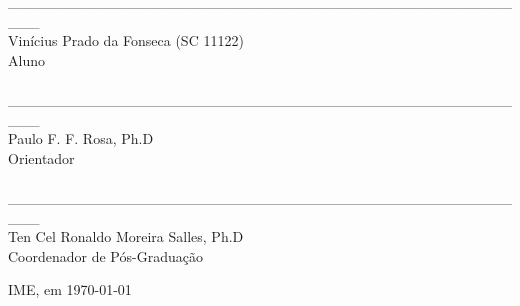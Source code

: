 \newpage
\begin{center}
\_\_\_\_\_\_\_\_\_\_\_\_\_\_\_\_\_\_\_\_\_\_\_\_\_\_\_\_\_\_\_\_\_\_\_\_\_\_\_\_\_\_\_\_\_\_\_\_\_\_\_ \\

Vinícius Prado da Fonseca (SC 11122) \\Aluno \\ 
 
\hspace{4cm}
\\


\_\_\_\_\_\_\_\_\_\_\_\_\_\_\_\_\_\_\_\_\_\_\_\_\_\_\_\_\_\_\_\_\_\_\_\_\_\_\_\_\_\_\_\_\_\_\_\_\_\_\_ \\
Paulo F. F. Rosa, Ph.D \\Orientador \\ 

\hspace{4cm}
\\


\_\_\_\_\_\_\_\_\_\_\_\_\_\_\_\_\_\_\_\_\_\_\_\_\_\_\_\_\_\_\_\_\_\_\_\_\_\_\_\_\_\_\_\_\_\_\_\_\_\_\_ \\
Ten Cel Ronaldo Moreira Salles, Ph.D \\Coordenador de Pós-Graduação \\

\hspace{4cm}

\end{center}


\begin{center}

IME, em \today
\end{center}

 \hspace{4cm}

%
%



